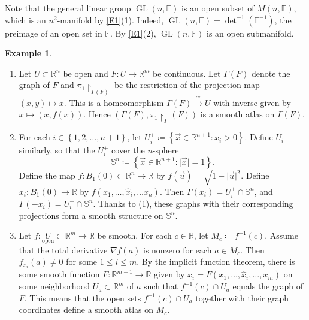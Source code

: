 \documentclass[10pt,letterpaper,cm]{nupset}
\theoremstyle{definition}
\newtheorem{exmp}[definition]{Example}
\theoremstyle{theorem}
\theoremstyle{remark}
\newcommand{\F}{\mathbb F}
\newcommand{\R}{\mathbb R}
\renewcommand{\S}{\mathbb S}
\newcommand{\1}{\mathbf{1}}
\renewcommand{\u}{\vec u}
\newcommand{\x}{\vec x}
\newcommand{\0}{\vec 0}
\DeclareMathOperator{\GL}{GL}
\begin{document}
Note that  the general linear group $\GL(n, \F)$ is an open subset of $M(n, \F)$, which is an $n^2$-manifold by \cref{E1}(1). Indeed, $\GL(n, \F) = \det^{-1}(\F^{-1})$, the preimage of an open set in $\F$. By \cref{E1}(2), $\GL(n, \F)$ is an open submanifold.

\begin{exmp} $ $
\begin{enumerate}[label=(\arabic*)]
\item Let $U\subset \R^n$ be open and $F: U \to \R^m$ be continuous. Let $\Gamma(F)$ denote the graph of $F$ and $\pi_1\restriction_{\Gamma(F)}$ be the restriction of the projection map $(x, y)\mapsto x$. This is a homeomorphism $\Gamma(F) \overset{\cong}{\longrightarrow} U$ with inverse given by $x \mapsto \left(x, f(x)\right)$. Hence $\left( \Gamma(F), \pi_1 \restriction_\Gamma(F)\right)$ is a smooth atlas on $\Gamma(F)$.
\item For each $i \in \left\{1, 2, \ldots, n+1\right\}$, let $U_i^+ \coloneqq  \left\{ \x \in \R^{n+1}: x_i >0\right\}$. Define $U_i^-$ similarly, so that the $U_i^{\pm}$ cover the $n$-sphere $$\S^n \coloneqq \left\{\x \in \R^{n+1} : \lvert{\x}\rvert = 1\right\}. $$ Define the map $f: B_1(0)\subset \R^n \to \R$ by $f(\u) = \sqrt{1 - \lvert{\u}\rvert^2}$. Define $x_i: B_1(0) \to \R$ by $f(x_1, \ldots, \hat{x}_i, \ldots x_n)$.  Then $\Gamma(x_i) = U_i^+ \cap \S^n$, and $\Gamma({-x_i}) = U_i^- \cap \S^n$. Thanks to (1), these graphs with their corresponding projections form a smooth structure on $\S^n$.
\item 
Let $f: \underset{\text{open}}U\subset \R^m \to \R$ be smooth. For each $c \in \R$, let $M_c\coloneqq f^{-1}(c)$. Assume that the total derivative $\nabla f(a)$ is nonzero for each $a \in M_c$.  Then $f_{x_i}(a) \ne 0$ for some $1 \leq i \leq m$. By the implicit function theorem, there is some smooth function $F: \R^{m-1} \to \R$ given by $x_i = F(x_1, \ldots, \hat{x}_i, \ldots, x_m)$ on some neighborhood $U_a\subset \R^m$ of $a$ such that $f^{-1}(c) \cap U_a$ equals the graph of $F$.  This means that the open sets $f^{-1}(c) \cap U_a$ together with their graph coordinates define a smooth atlas on $M_c$.
\end{enumerate}
\end{exmp}
\end{document}
